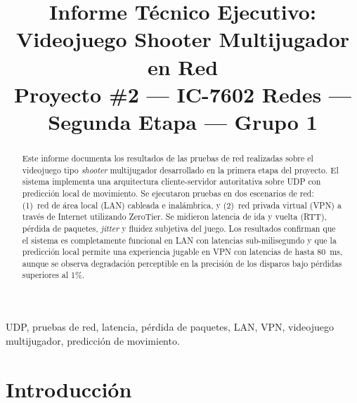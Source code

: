 \documentclass[conference]{IEEEtran}
\begin{document}
\title{Informe T\'ecnico Ejecutivo: Videojuego Shooter Multijugador en Red\\
{\footnotesize Proyecto \#2 --- IC-7602 Redes --- Segunda Etapa --- Grupo 1}}

\author{
}

\maketitle

\begin{abstract}
Este informe documenta los resultados de las pruebas de red realizadas sobre el videojuego tipo \textit{shooter} multijugador desarrollado en la primera etapa del proyecto. El sistema implementa una arquitectura cliente-servidor autoritativa sobre UDP con predicci\'on local de movimiento. Se ejecutaron pruebas en dos escenarios de red: (1)~red de \'area local (LAN) cableada e inal\'ambrica, y (2)~red privada virtual (VPN) a trav\'es de Internet utilizando ZeroTier. Se midieron latencia de ida y vuelta (RTT), p\'erdida de paquetes, \textit{jitter} y fluidez subjetiva del juego. Los resultados confirman que el sistema es completamente funcional en LAN con latencias sub-milisegundo y que la predicci\'on local permite una experiencia jugable en VPN con latencias de hasta 80~ms, aunque se observa degradaci\'on perceptible en la precisi\'on de los disparos bajo p\'erdidas superiores al 1\%.
\end{abstract}

\begin{IEEEkeywords}
UDP, pruebas de red, latencia, p\'erdida de paquetes, LAN, VPN, videojuego multijugador, predicci\'on de movimiento.
\end{IEEEkeywords}

\section{Introducci\'on}
\end{document}
